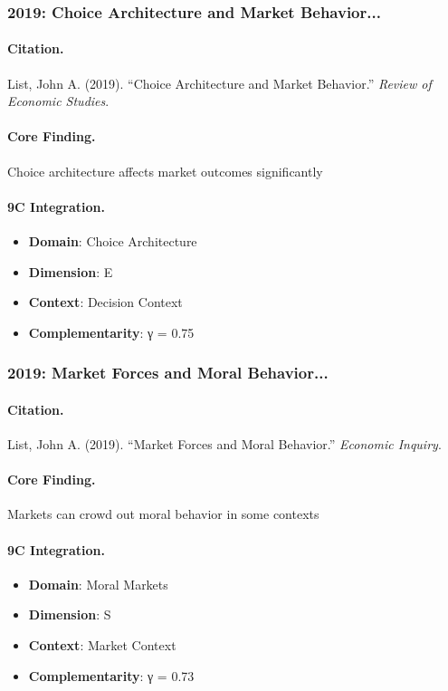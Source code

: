 \subsubsection{2019: Choice Architecture and Market Behavior...}

\paragraph{Citation.}
List, John A. (2019). ``Choice Architecture and Market Behavior.''
\textit{Review of Economic Studies}.

\paragraph{Core Finding.}
Choice architecture affects market outcomes significantly

\paragraph{9C Integration.}
\begin{itemize}[nosep]
  \item \textbf{Domain}: Choice Architecture
  \item \textbf{Dimension}: E
  \item \textbf{Context}: Decision Context
  \item \textbf{Complementarity}: γ = 0.75
\end{itemize}


\subsubsection{2019: Market Forces and Moral Behavior...}

\paragraph{Citation.}
List, John A. (2019). ``Market Forces and Moral Behavior.''
\textit{Economic Inquiry}.

\paragraph{Core Finding.}
Markets can crowd out moral behavior in some contexts

\paragraph{9C Integration.}
\begin{itemize}[nosep]
  \item \textbf{Domain}: Moral Markets
  \item \textbf{Dimension}: S
  \item \textbf{Context}: Market Context
  \item \textbf{Complementarity}: γ = 0.73
\end{itemize}


